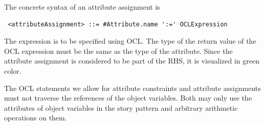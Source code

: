 The concrete syntax of an attribute assignment is
\begin{lstlisting}
 <attributeAssignment> ::= #Attribute.name ':=' OCLExpression
\end{lstlisting}
The expression is to be specified using OCL. 
The type of the return value of the OCL expression must be the same as the type of the attribute. 
Since the attribute assignment is considered to be part of the RHS, it is visualized in green color.

The OCL statements we allow for attribute constraints and attribute assignments must not traverse the references of the object variables.
Both may only use the attributes of object variables in the story pattern and arbitrary arithmetic operations on them. 


\ext  %
